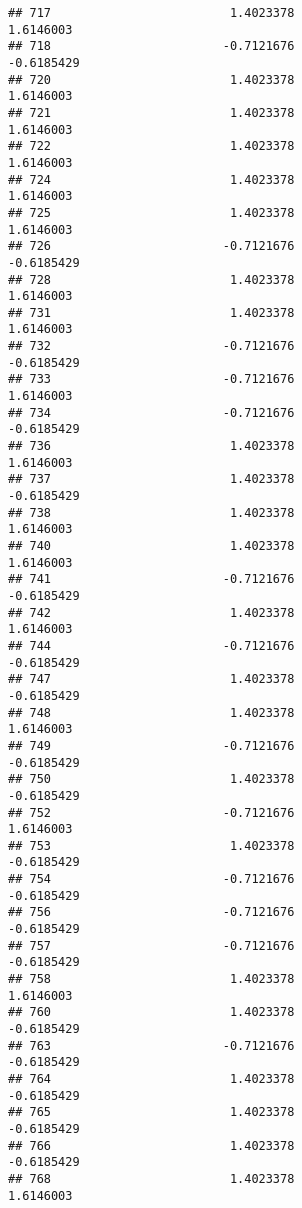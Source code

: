 \documentclass[
]{article}
\begin{document}
\begin{verbatim}
## 717                         1.4023378                        1.6146003
## 718                        -0.7121676                       -0.6185429
## 720                         1.4023378                        1.6146003
## 721                         1.4023378                        1.6146003
## 722                         1.4023378                        1.6146003
## 724                         1.4023378                        1.6146003
## 725                         1.4023378                        1.6146003
## 726                        -0.7121676                       -0.6185429
## 728                         1.4023378                        1.6146003
## 731                         1.4023378                        1.6146003
## 732                        -0.7121676                       -0.6185429
## 733                        -0.7121676                        1.6146003
## 734                        -0.7121676                       -0.6185429
## 736                         1.4023378                        1.6146003
## 737                         1.4023378                       -0.6185429
## 738                         1.4023378                        1.6146003
## 740                         1.4023378                        1.6146003
## 741                        -0.7121676                       -0.6185429
## 742                         1.4023378                        1.6146003
## 744                        -0.7121676                       -0.6185429
## 747                         1.4023378                       -0.6185429
## 748                         1.4023378                        1.6146003
## 749                        -0.7121676                       -0.6185429
## 750                         1.4023378                       -0.6185429
## 752                        -0.7121676                        1.6146003
## 753                         1.4023378                       -0.6185429
## 754                        -0.7121676                       -0.6185429
## 756                        -0.7121676                       -0.6185429
## 757                        -0.7121676                       -0.6185429
## 758                         1.4023378                        1.6146003
## 760                         1.4023378                       -0.6185429
## 763                        -0.7121676                       -0.6185429
## 764                         1.4023378                       -0.6185429
## 765                         1.4023378                       -0.6185429
## 766                         1.4023378                       -0.6185429
## 768                         1.4023378                        1.6146003

\end{verbatim}
\end{document}
